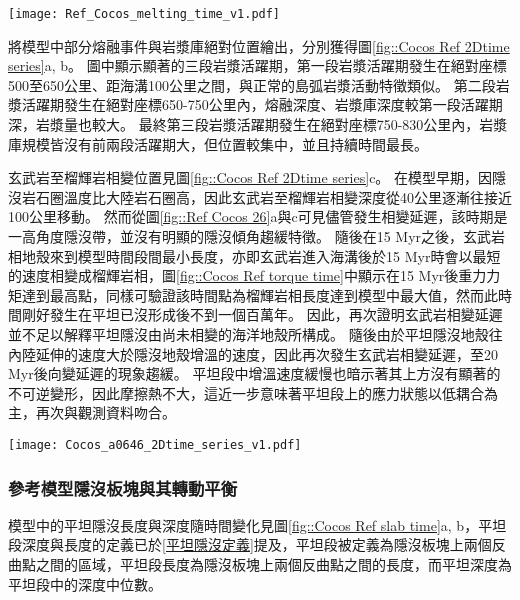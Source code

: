 \begin{figure*}[hb]
    \centering
    \texttt{[image: Ref\_Cocos\_melting\_time\_v1.pdf]}
    \caption[科克斯參考模型岩漿作用隨時間變化]{科克斯參考模型岩漿作用隨時間變化，灰色底標出平坦隱沒發育後時間段。(a)部分熔融與海溝之距離隨時間變化圖，縱軸中每個點代表每次部分熔融發生位置，顏色為部分指數上的熔融比例。(b)部分熔融量隨時間變化圖，部分熔融量單位為每單位海溝產生之立方公里量中每20萬年瞬時量。顏色代表不同岩相。}
    \label{fig::Cocos Ref melting time}
\end{figure*}


將模型中部分熔融事件與岩漿庫絕對位置繪出，分別獲得圖\ref{fig::Cocos Ref 2Dtime series}a, b。
圖中顯示顯著的三段岩漿活躍期，第一段岩漿活躍期發生在絕對座標500至650公里、距海溝100公里之間，與正常的島弧岩漿活動特徵類似。
第二段岩漿活躍期發生在絕對座標650-750公里內，熔融深度、岩漿庫深度較第一段活躍期深，岩漿量也較大。
最終第三段岩漿活躍期發生在絕對座標750-830公里內，岩漿庫規模皆沒有前兩段活躍期大，但位置較集中，並且持續時間最長。

玄武岩至榴輝岩相變位置見圖\ref{fig::Cocos Ref 2Dtime series}c。
在模型早期，因隱沒岩石圈溫度比大陸岩石圈高，因此玄武岩至榴輝岩相變深度從40公里逐漸往接近100公里移動。
然而從圖\ref{fig::Ref Cocos 26}a與c可見儘管發生相變延遲，該時期是一高角度隱沒帶，並沒有明顯的隱沒傾角趨緩特徵。
隨後在15 Myr之後，玄武岩相地殼來到模型時間段間最小長度，亦即玄武岩進入海溝後於15 Myr時會以最短的速度相變成榴輝岩相，圖\ref{fig::Cocos Ref torque time}中顯示在15 Myr後重力力矩達到最高點，同樣可驗證該時間點為榴輝岩相長度達到模型中最大值，然而此時間剛好發生在平坦已沒形成後不到一個百萬年。
因此，再次證明玄武岩相變延遲並不足以解釋平坦隱沒由尚未相變的海洋地殼所構成。
隨後由於平坦隱沒地殼往內陸延伸的速度大於隱沒地殼增溫的速度，因此再次發生玄武岩相變延遲，至20 Myr後向變延遲的現象趨緩。
平坦段中增溫速度緩慢也暗示著其上方沒有顯著的不可逆變形，因此摩擦熱不大，這近一步意味著平坦段上的應力狀態以低耦合為主，再次與觀測資料吻合。


\begin{figure*}[ht]
    \centering
    \texttt{[image: Cocos\_a0646\_2Dtime\_series\_v1.pdf]}
    \caption[科克斯參考模型部分熔融、岩漿庫與玄武岩相變時空關係圖]{科克斯參考模型部分熔融、岩漿庫與玄武岩相變時空關係圖。}
    \label{fig::Cocos Ref 2Dtime series}
\end{figure*}

\newpage
\subsubsection{參考模型隱沒板塊與其轉動平衡}
模型中的平坦隱沒長度與深度隨時間變化見圖\ref{fig::Cocos Ref slab time}a, b，平坦段深度與長度的定義已於\ref{平坦隱沒定義}提及，平坦段被定義為隱沒板塊上兩個反曲點之間的區域，平坦段長度為隱沒板塊上兩個反曲點之間的長度，而平坦深度為平坦段中的深度中位數。

